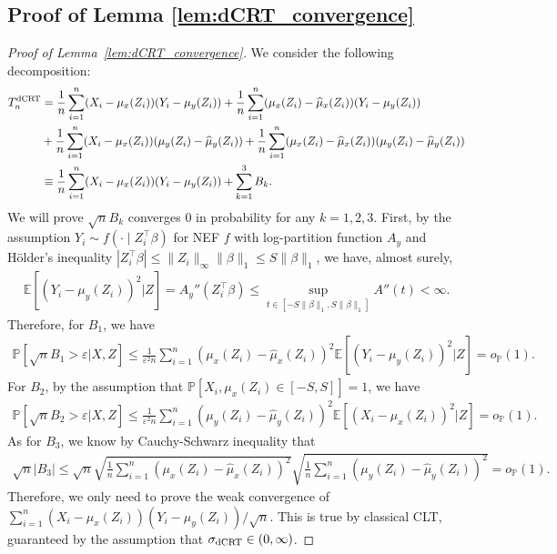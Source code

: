 \documentclass[12pt]{article}
\theoremstyle{definition}
\def\P{\mathbb{P}}
\def\P{\mathbb{P}}
\newcommand{\E}{\mathbb E}								%
\renewcommand{\P}{\mathbb{P}}							%
\newcommand{\srx}{X}									%
\newcommand{\srz}{Z}									%
\newcommand{\sry}{Y}									%
\newcommand{\dCRT}{\textnormal{dCRT}} 					%
\begin{document}
\subsection{Proof of Lemma \ref{lem:dCRT_convergence}}
\begin{proof}[Proof of Lemma~\ref{lem:dCRT_convergence}]
	
We consider the following decomposition:
\begin{align*}
  T_n^{\dCRT}
  &
  =\frac{1}{n}\sum_{i=1}^n (\srx_i-\mu_x(\srz_i))(\sry_i-\mu_y(\srz_i)) + \frac{1}{n}\sum_{i=1}^n (\mu_{x}(\srz_i)-\widehat{\mu}_{x}(\srz_i))(\sry_i-\mu_{y}(\srz_i))\\
  &
  + \frac{1}{n}\sum_{i=1}^n (\srx_i-\mu_{x}(\srz_i))(\mu_{y}(\srz_i)-\widehat{\mu}_{y}(\srz_i))+\frac{1}{n}\sum_{i=1}^n (\mu_{x}(\srz_i)-\widehat{\mu}_{x}(\srz_i))(\mu_{y}(\srz_i)-\widehat{\mu}_{y}(\srz_i))\\
  &
  \equiv \frac{1}{n}\sum_{i=1}^n (\srx_i-\mu_x(\srz_i))(\sry_i-\mu_y(\srz_i))+\sum_{k=1}^3B_k.
\end{align*}
We will prove $\sqrt{n}B_k$ converges $0$ in probability for any $k=1,2,3$. First, by the assumption $\sry_i\sim f( \cdot \mid \srz_i^\top\beta)$ for NEF $f$ with log-partition function $A_y$ and H\"older's inequality $|\srz_i^\top\beta|\leq \|\srz_i\|_{\infty}\|\beta\|_1\leq S\|\beta\|_1$, we have, almost surely,
\begin{align*}
	\E[(\sry_i-\mu_{y}(\srz_i))^2|\srz]=A_y''(\srz_i^\top\beta)\leq \sup_{t\in [-S\|\beta\|_1,S\|\beta\|_1]}A''(t)<\infty.
\end{align*}
Therefore, for $B_1$, we have 
\begin{align*}
  \P\left[\sqrt{n}B_1>\varepsilon|\srx,\srz\right]\leq \frac{1}{\varepsilon^2n}\sum_{i=1}^n (\mu_{x}(\srz_i)-\widehat{\mu}_{x}(\srz_i))^2\E[(\sry_i-\mu_{y}(\srz_i))^2|\srz]=o_{\P}(1).
\end{align*}
For $B_2$, by the assumption that $\P[X_i,\mu_x(\srz_i)\in [-S,S]]=1$, we have
\begin{align*}
  \P\left[\sqrt{n}B_2>\varepsilon|\srx,\srz\right]\leq \frac{1}{\varepsilon^2n}\sum_{i=1}^n (\mu_{y}(\srz_i)-\widehat{\mu}_{y}(\srz_i))^2\E[(\srx_i-\mu_{x}(\srz_i))^2|\srz]=o_{\P}(1).
\end{align*}
As for $B_3$, we know by Cauchy-Schwarz inequality that
\begin{align*}
  \sqrt{n}|B_3|\leq \sqrt{n}\sqrt{\frac{1}{n}\sum_{i=1}^n (\mu_{x}(\srz_i)-\widehat{\mu}_{x}(\srz_i))^2}\sqrt{\frac{1}{n}\sum_{i=1}^n (\mu_{y}(\srz_i)-\widehat{\mu}_{y}(\srz_i))^2}=o_{\P}(1).
\end{align*}
Therefore, we only need to prove the weak convergence of $\sum_{i=1}^n (\srx_i-\mu_x(\srz_i))(\sry_i-\mu_y(\srz_i))/\sqrt{n}$. This is true by classical CLT, guaranteed by the assumption that $\sigma_{\dCRT}\in(0,\infty)$.
\end{proof}
\end{document}
